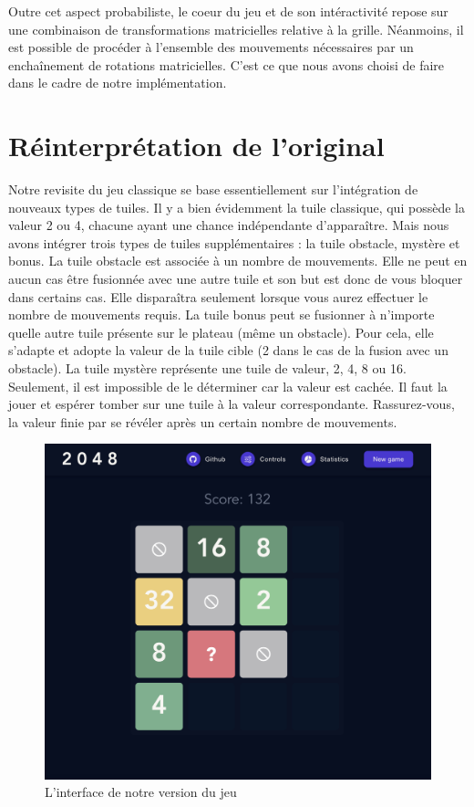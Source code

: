 \documentclass[a4paper, 12pt]{report}
\begin{document}
\vspace{0.5cm}

\tabto{1cm}Outre cet aspect probabiliste, le coeur du jeu et de son intéractivité repose sur une
combinaison de transformations matricielles relative à la grille. Néanmoins, il est possible de
procéder à l'ensemble des mouvements nécessaires par un enchaînement de rotations matricielles.
C'est ce que nous avons choisi de faire dans le cadre de notre implémentation.

\chapter{Réinterprétation de l'original}

\tabto{1cm}Notre revisite du jeu classique se base essentiellement sur l'intégration de nouveaux types de tuiles.
\tabto{1cm}Il y a bien évidemment la tuile classique, qui possède la valeur 2 ou 4, chacune ayant une chance indépendante d'apparaître.
Mais nous avons intégrer trois types de tuiles supplémentaires : la tuile obstacle, mystère et bonus.
\tabto{1cm}La tuile obstacle est associée à un nombre de mouvements. Elle ne peut en aucun cas être fusionnée avec une autre tuile et son but est donc 
de vous bloquer dans certains cas. Elle disparaîtra seulement lorsque vous aurez effectuer le nombre de mouvements requis.
\tabto{1cm}La tuile bonus peut se fusionner à n'importe quelle autre tuile présente sur le plateau (même un obstacle). Pour cela, elle s'adapte et adopte la valeur
de la tuile cible (2 dans le cas de la fusion avec un obstacle).
\tabto{1cm}La tuile mystère représente une tuile de valeur, 2, 4, 8 ou 16. Seulement, il est impossible de le déterminer car la valeur est cachée.
Il faut la jouer et espérer tomber sur une tuile à la valeur correspondante. Rassurez-vous, la valeur finie par se révéler après un certain nombre de mouvements.

\begin{figure}[!t]
\centering
\includegraphics[width=1\textwidth]{images/2048-revisited-version.jpg}
\caption{L'interface de notre version du jeu}
\label{Revisited version}
\end{figure}
\end{document}
